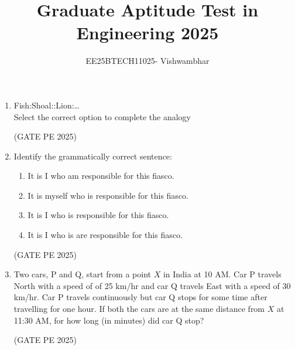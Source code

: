 \documentclass[journal,12pt,onecolumn]{IEEEtran}
\title{Graduate Aptitude Test in Engineering 2025}
\author{EE25BTECH11025- Vishwambhar}
\theoremstyle{remark}
\begin{document}
\maketitle

\begin{enumerate}

\item Fish:Shoal::Lion:\dots\\
Select the correct option to complete the analogy
\begin{enumerate}
\end{enumerate}
\hfill{(GATE PE 2025)}

\item Identify the grammatically correct sentence:
\begin{enumerate}
    \item It is I who am responsible for this fiasco.
    \item It is myself who is responsible for this fiasco.
    \item It is I who is responsible for this fiasco.
    \item It is I who is are responsible for this fiasco.
\end{enumerate}
\hfill{(GATE PE 2025)}

\item Two cars, P and Q, start from a point $X$ in India at 10 AM. Car P travels North with a speed of of 25 km/hr and car Q travels East with a speed of 30 km/hr. Car P travels continuously but car Q stops for some time after travelling for one hour. If both the cars are at the same distance from $X$ at 11:30 AM, for how long (in minutes) did car Q stop?
\begin{enumerate}
\end{enumerate}
\hfill{(GATE PE 2025)}


\end{enumerate}
\end{document}
